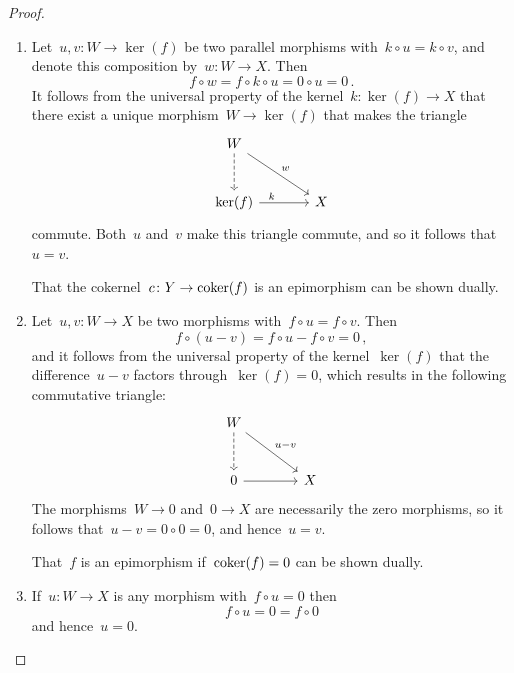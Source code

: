 \begin{proof}
  \leavevmode
  \begin{enumerate}
    \item
      Let~$u, v \colon W \to \ker(f)$ be two parallel morphisms with~$k \circ u = k \circ v$, and denote this composition by~$w \colon W \to X$.
      Then
      \[
          f \circ w
        = f \circ k \circ u
        = 0 \circ u
        = 0 \,.
      \]
      It follows from the universal property of the kernel~$k \colon \ker(f) \to X$ that there exist a unique morphism~$W \to \ker(f)$ that makes the triangle
      \[
        \begin{tikzcd}[sep = large]
            W
            \arrow[dashed]{d}
            \arrow{dr}[above right]{w}
          & {}
          \\
            \ker(f)
            \arrow{r}[above, near start]{k}
          & X
        \end{tikzcd}
      \]
      commute.
      Both~$u$ and~$v$ make this triangle commute, and so it follows that~$u = v$.
      
      That the cokernel~$c \colon Y \to \operatorname{coker}(f)$ is an epimorphism can be shown dually.
    \item
      Let~$u,v \colon W \to X$ be two morphisms with~$f \circ u = f \circ v$.
      Then
      \[
          f \circ (u-v)
        = f \circ u - f \circ v
        = 0 \,,
      \]
      and it follows from the universal property of the kernel~$\ker(f)$ that the difference~$u-v$ factors through~$\ker(f) = 0$, which results in the following commutative triangle:
      \[
        \begin{tikzcd}[sep = large]
            W
            \arrow[dashed]{d}
            \arrow{dr}[above right]{u-v}
          & {}
          \\
            0
            \arrow{r}
          & X
        \end{tikzcd}
      \]
      The morphisms~$W \to 0$ and~$0 \to X$ are necessarily the zero morphisms, so it follows that~$u-v = 0 \circ 0 = 0$, and hence~$u = v$.
      
      That~$f$ is an epimorphism if~$\operatorname{coker}(f) = 0$ can be shown dually.
    \item
      If~$u \colon W \to X$ is any morphism with~$f \circ u = 0$ then
      \[
          f \circ u
        = 0
        = f \circ 0
      \]
      and hence~$u = 0$.
      

\end{enumerate}
\end{proof}
